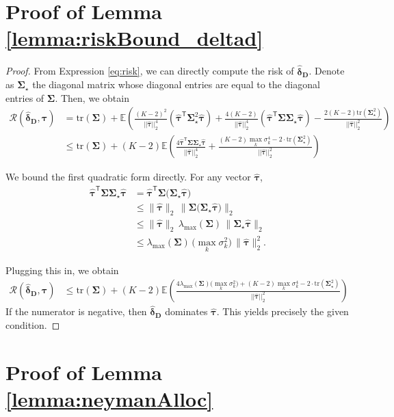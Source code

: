 \documentclass{article}
\newcommand{\bsSigma}{\boldsymbol \Sigma}
\newcommand{\bstau}{\boldsymbol \tau}
\newcommand{\hbstau}{\boldsymbol{\hat \tau}}
\newcommand{\bsSig}{\boldsymbol  \Sigma}
\newcommand{\bsdeltad}{\boldsymbol{\hat \delta_{\textbf{D}}}}
\def\E{\mathbb{E}}
\newcommand{\Tr}{\text{tr}}
\newcommand{\tran}{\mathsf{T}}
\newcommand{\lambdamax}{\lambda_{\text{max}}(\bsSig)}
\begin{document}
\section{Proof of Lemma \ref{lemma:riskBound_deltad}}\label{sec:proof_deltad}
\begin{proof}
From Expression \ref{eq:risk}, we can directly compute the risk of $\bsdeltad$. Denote as $\bsSigma_{\star}$ the diagonal matrix whose diagonal entries are equal to the diagonal entries of $\bsSigma$. Then, we obtain
\begin{align*}
\mathcal{R}\left( \bsdeltad, \bstau \right) 
&=  \Tr(\bsSigma) + \E \left( \frac{(K - 2)^2}{|| \hbstau||_2^4} \left(\hbstau^\tran \bsSigma_{\star}^2 \hbstau \right) + \frac{4(K - 2)}{|| \hbstau||_2^4} \left(\hbstau^\tran \bsSigma \bsSigma_{\star} \hbstau \right) - \frac{2(K-2) \Tr(\boldsymbol \Sigma_{\star}^2) }{|| \hbstau||_2^2}  \right) \\
&\leq \Tr(\bsSigma) + (K - 2) \E \left( \frac{4 \hbstau^\tran \bsSigma \bsSigma_{\star} \hbstau }{|| \hbstau||_2^4} + \frac{(K - 2) \max_k \sigma_k^4 - 2\cdot\Tr(\bsSigma_{\star}^2)}{||\hbstau||_2^2} \right)
\end{align*}

We bound the first quadratic form directly. For any vector $\hbstau$,
\begin{align*}
\hbstau^\tran \bsSigma \bsSigma_{\star} \hbstau
&= \hbstau^\tran \bsSigma \big( \bsSigma_{\star} \hbstau \big) \\
&\le \| \hbstau \|_2 \, \big\| \bsSigma \big( \bsSigma_{\star} \hbstau \big) \big\|_2 \\
&\le \| \hbstau \|_2 \, \lambdamax \, \big\| \bsSigma_{\star} \hbstau \big\|_2 \\
&\le \lambdamax \, \big( \max_k \sigma_k^2 \big) \, \| \hbstau \|_2^2 .
\end{align*}

Plugging this in, we obtain
\begin{align*}
\mathcal{R}\left( \bsdeltad, \bstau \right) 
&\leq \Tr(\bsSigma) + (K - 2) \E \left(  \frac{4 \lambdamax \big( \max_k \sigma_k^2 \big)  + (K - 2) \max_k \sigma_k^4 - 2\cdot\Tr(\bsSigma_{\star}^2)}{||\hbstau||_2^2} \right)
\end{align*}
If the numerator is negative, then $\bsdeltad$ dominates $\hbstau$. This yields precisely the given condition. 

\end{proof}




\section{Proof of Lemma \ref{lemma:neymanAlloc}}\label{sec:proof_neymanAlloc}
\end{document}
